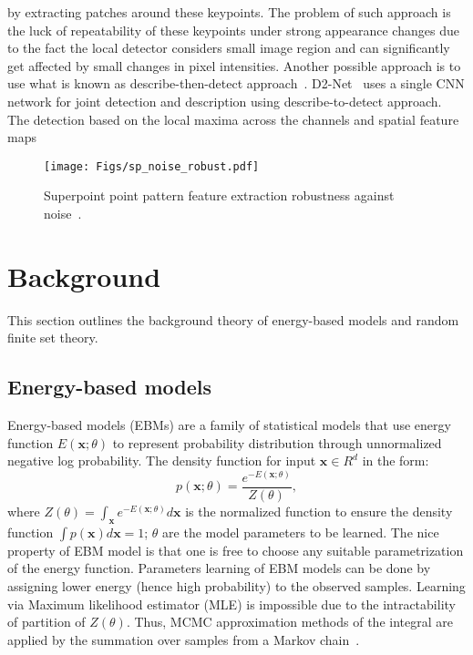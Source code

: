 \documentclass[journal]{IEEEtran}
\let\MYoriglatexcaption\caption
\renewcommand{\caption}[2][\relax]{\MYoriglatexcaption[#2]{#2}}
\begin{document}
by extracting patches around these keypoints. The problem of such approach is the luck of repeatability of these keypoints under strong appearance changes due to the fact the local detector considers small image region and can significantly get affected by small changes in pixel intensities.  Another possible approach is to use what is known as describe-then-detect approach~\cite{tian2020d2d}.  D2-Net~\cite{dusmanu2019d2} uses a single CNN network for joint detection and description using describe-to-detect approach.  The detection based on the local maxima across the channels and spatial feature maps

\begin{figure*}
	
	\texttt{[image: Figs/sp\_noise\_robust.pdf]}
	\caption{Superpoint point pattern feature extraction robustness against noise~\cite{detone2017toward}.}
	\label{Fig:sp_noise}

\end{figure*}

\section{Background}
\label{Sec:background}
This section outlines the background theory of energy-based models and random finite set theory.
\subsection{Energy-based models}
Energy-based models (EBMs) are a family of statistical models that use energy function $E(\mathbf{x};\theta)$ to represent probability distribution through unnormalized negative log probability. The density function for input $\mathbf{x}\in R^d$ in the form:
\begin{equation}
p(\mathbf{x};\theta)=\frac{e^{-E(\mathbf{x};\theta)}}{Z(\theta)},
\end{equation}
where $Z(\theta)=\int_{\mathbf{x}}e^{-E(\mathbf{x};\theta)}d\mathbf{x}$ is the normalized function to ensure the density function $\int p(\mathbf{x})d\mathbf{x}=1$; $\theta$ are the model parameters to be learned. The nice property of EBM model is that one is free to choose any suitable parametrization of the energy function. Parameters learning of EBM models can be done by assigning lower energy (hence high probability) to the observed samples. Learning via Maximum likelihood estimator (MLE) is impossible due to the intractability of partition of $Z(\theta)$. Thus, MCMC approximation methods of the integral are applied by the summation over samples from a Markov chain~\cite{zhai2016deep}. 
\end{document}
